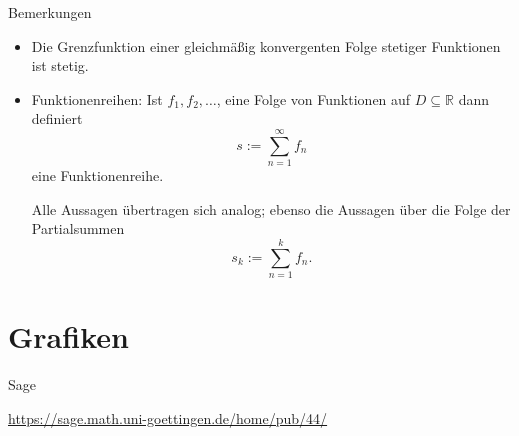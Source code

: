 \documentclass[notes=hide,hyperref={dvipdfmx,pdfpagelabels=false}]{beamer}
\begin{document}
\begin{frame}{Bemerkungen}
\begin{itemize}
\item Die Grenzfunktion einer gleichmäßig konvergenten Folge stetiger
Funktionen ist stetig.
\item \alert{Funktionenreihen}: Ist $f_1, f_2, \ldots$, eine Folge von Funktionen auf $D \subseteq \mathbb{R}$ dann definiert
\[
 s := \sum_{n=1}^\infty f_n
\]
eine Funktionenreihe. 

Alle Aussagen übertragen sich analog; ebenso die Aussagen über die Folge der Partialsummen
\[
 s_k := \sum_{n=1}^k f_n.
\]
 
 
\end{itemize}
\end{frame}

\section{Grafiken}



\begin{frame}{Sage}
    \begin{center}
        \url{https://sage.math.uni-goettingen.de/home/pub/44/}
    \end{center}
\end{frame}


















\end{document}
